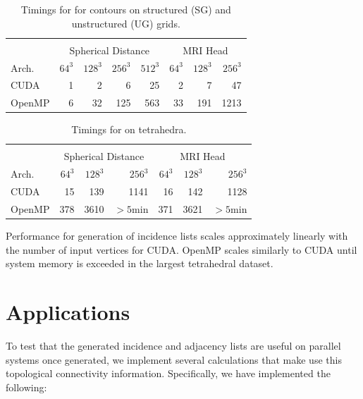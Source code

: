 \documentclass[review,journal]{vgtc}         %
\begin{document}
\begin{table}[tb!]
\begin{center}
\caption{Timings for  for contours on structured (SG) and unstructured (UG) grids.}
\label{tab:toptimings}
\begin{tabular}{l|r r r r|r r r}
\multicolumn{8}{c}{ } \\
 & \multicolumn{4}{|c|}{Spherical Distance} & \multicolumn{3}{|c}{MRI Head}\\
Arch. & $64^3$ & $128^3$ & $256^3$ & $512^3$ & $64^3$ & $128^3$ & $256^3$\\
\hline
CUDA & 1 & 2 & 6 & 25 & 2 & 7 & 47 \\
OpenMP & 6 & 32 & 125 & 563 & 33 & 191 & 1213 \\
\end{tabular}
\end{center}
\end{table}

\begin{table}[tb!]
\begin{center}
\caption{Timings for  on tetrahedra.}
\label{tab:toptimingstetra}
\begin{tabular}{l|r r r|r r r}
\multicolumn{7}{c}{ } \\
 & \multicolumn{3}{|c|}{Spherical Distance} & \multicolumn{3}{|c}{MRI Head}\\
Arch. & $64^3$ & $128^3$ & $256^3$ & $64^3$ & $128^3$ & $256^3$\\
\hline
CUDA & 15 & 139 & 1141 & 16 & 142 & 1128 \\
OpenMP & 378 & 3610 & $>5$min & 371 & 3621 & $>5$min \\
\end{tabular}
\end{center}
\end{table}

Performance for generation of incidence lists scales approximately linearly with the number of input vertices for CUDA. OpenMP scales similarly to CUDA until system memory is exceeded in the largest tetrahedral dataset.

\section{Applications}
To test that the generated incidence and adjacency lists are useful on parallel systems once generated, we implement several calculations that make use this topological connectivity information. Specifically, we have implemented the following:
\end{document}
